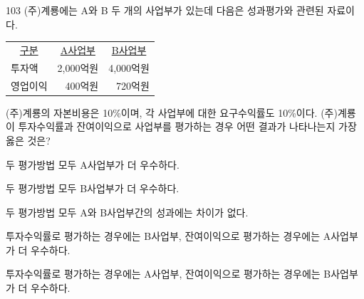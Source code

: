 \begin{question}{103}
(주)계룡에는 A와 B 두 개의 사업부가 있는데 다음은 성과평가와 관련된 자료이다.

{\small\centering
\begin{tabular}{lrr}
\hline
\multicolumn{1}{c}{\uline{구분}} & \multicolumn{1}{c}{\uline{A사업부}} & \multicolumn{1}{c}{\uline{B사업부}} \\
투자액 & 2,000억원 & 4,000억원 \\
영업이익 & 400억원 & 720억원 \\
\hline
\end{tabular}
\par}

(주)계룡의 자본비용은 10\%이며, 각 사업부에 대한 요구수익률도 10\%이다. (주)계룡이 투자수익률과 잔여이익으로 사업부를 평가하는 경우 어떤 결과가 나타나는지 가장 옳은 것은? \par
\begin{choices}
  \item 두 평가방법 모두 A사업부가 더 우수하다.
  \item 두 평가방법 모두 B사업부가 더 우수하다.
  \item 두 평가방법 모두 A와 B사업부간의 성과에는 차이가 없다.
  \item 투자수익률로 평가하는 경우에는 B사업부, 잔여이익으로 평가하는 경우에는 A사업부가 더 우수하다.
  \item 투자수익률로 평가하는 경우에는 A사업부, 잔여이익으로 평가하는 경우에는 B사업부가 더 우수하다.
\end{choices}
\end{question}
